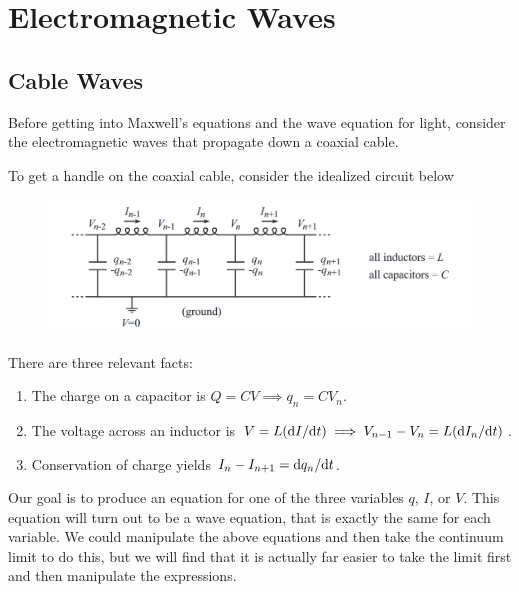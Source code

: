 \chapter{Electromagnetic Waves}
\section{Cable Waves}
Before getting into Maxwell's equations and the wave equation for light, consider the electromagnetic waves that propagate down a coaxial cable.

To get a handle on the coaxial cable, consider the idealized circuit below
\begin{figure}[h!]
    \centering
    \includegraphics[width=\linewidth]{figures/circuit.png}
\end{figure}

There are three relevant facts:
\begin{enumerate}
    \item The charge on a capacitor is $Q = CV \implies q_n = CV_n$.
    \item The voltage across an inductor is $V = L(\dd I/\dd t) \implies V_{n-1} - V_n = L(\dd I_n/\dd t)$.
    \item Conservation of charge yields $I_n - I_{n+1} = \dd q_n/\dd t$.
\end{enumerate}
Our goal is to produce an equation for one of the three variables $q$, $I$, or $V$. This equation will turn out to be a wave equation, that is exactly the same for each variable. We could manipulate the above equations and then take the continuum limit to do this, but we will find that it is actually far easier to take the limit first and then manipulate the expressions.

